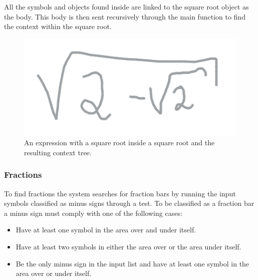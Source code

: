 All the symbols and objects found inside are linked to the square root object as the body. This body is then sent recursively through the main function to find the context within the square root.

\begin{figure}[H]
\begin{center}
    \includegraphics[scale=0.5]{Assets/Chapter3_Method/interpretation-sqrt.png}
\end{center}
\centering
    \caption{An expression with a square root inside a square root and the resulting context tree.}

\label{fig:segmentation}
\end{figure}

\subsubsection{Fractions}

To find fractions the system searches for fraction bars by running the input symbols classified as minus signs through a test. To be classified as a fraction bar a minus sign must comply with one of the following cases:

\begin{itemize}
    \setlength\itemsep{0em}
    \item Have at least one symbol in the area over and under itself.
    \item Have at least two symbols in either the area over or the area under itself.
    \item Be the only minus sign in the input list and have at least one symbol in the area over or under itself.
\end{itemize}

